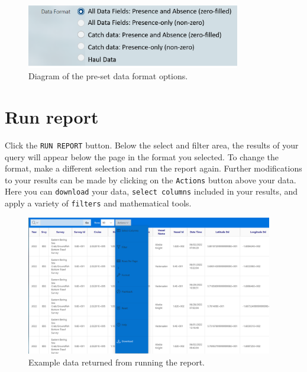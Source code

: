 \documentclass[
  letterpaper,
  oneside,
  open=any]{scrbook}
\begin{document}
\begin{figure}

{\centering \includegraphics[width=3.68in,height=\textheight]{content/../img/foss_4_data_format.png}

}

\caption{Diagram of the pre-set data format options.}

\end{figure}

\hypertarget{run-report}{%
\section{Run report}\label{run-report}}

Click the \texttt{RUN\ REPORT} button. Below the select and filter area,
the results of your query will appear below the page in the format you
selected. To change the format, make a different selection and run the
report again. Further modifications to your results can be made by
clicking on the \texttt{Actions} button above your data. Here you can
\texttt{download} your data, \texttt{select\ columns} included in your
results, and apply a variety of \texttt{filters} and mathematical tools.

\begin{figure}

{\centering \includegraphics[width=4.24in,height=\textheight]{content/../img/foss_5_run_report.png}

}

\caption{Example data returned from running the report.}

\end{figure}
\end{document}
